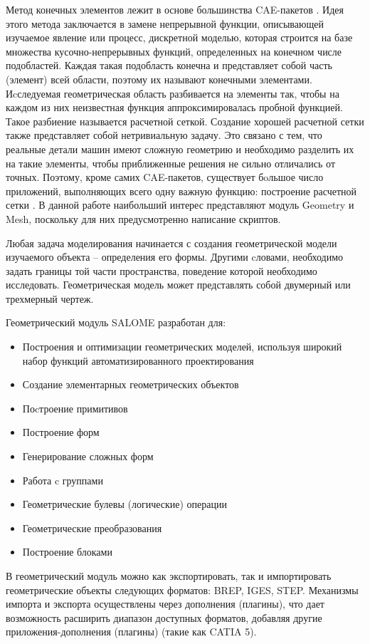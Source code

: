 \documentclass[a4paper,12pt]{article}
\theoremstyle{plain} %
\theoremstyle{definition} %
\theoremstyle{remark} %
\begin{document}
	Метод конечных элементов лежит в основе большинства CAE-пакетов . Идея этого метода заключается в замене непрерывной функции, описывающей изучаемое явление или процесс, дискретной моделью, которая строится на базе множества кусочно-непрерывных функций, определенных на конечном числе подобластей. Каждая такая подобласть конечна и представляет собой часть (элемент) всей области, поэтому их называют конечными элементами. Иcследуемая геометрическая область разбивается на элементы так, чтобы на каждом из них неизвестная функция аппроксимировалась пробной функцией. Такое разбиение называется расчетной сеткой. Создание хорошей расчетной сетки также представляет собой нетривиальную задачу. Это связано с тем, что реальные детали машин имеют сложную геометрию и необходимо разделить их на такие элементы, чтобы приближенные решения не сильно отличались от точных. Поэтому, кроме самих CAE-пакетов, существует бoльшое число приложений, выполняющих всего одну важную функцию: построение расчетной сетки \cite{wIbmSalome}. В данной работе наибольший интерес представляют модуль Geometry и Mesh, поскольку для них предусмотренно написание скриптов.
	
	Любая задача моделирования начинается с создания геометрической модели изучаемого объекта – определения его формы. Другими cловами, необходимо задать границы той части пространства, поведение которой необходимо исследовать. Геометрическая модель может представлять собой двумерный или трехмерный чертеж.
	
	Геометрический модуль SALOME разработан для:
	\begin{itemize}
		\item Построения и оптимизации геометрических моделей, используя широкий набор функций автоматизированного проектирования
		\item Создание элементарных геометрических объектов
		\item Поcтроение примитивов
		\item Построение форм
		\item Генерирование сложных форм
		\item Работа c группами
		\item Геометрические булевы (логические) операции
		\item Геометрические преобразования
		\item Построение блоками
	\end{itemize}
	
	В геометрический модуль можно как экспортировать, так и импортировать геометрические объекты следующих форматов: BREP, IGES, STEP. Механизмы импорта и экспорта осуществлены через дополнения (плагины), что дает возможность расширить диапазон доступных форматов, добавляя другие приложения-дополнения (плагины) (такие как CATIA 5)\cite{wLadugaGeom}.
	
\end{document}
